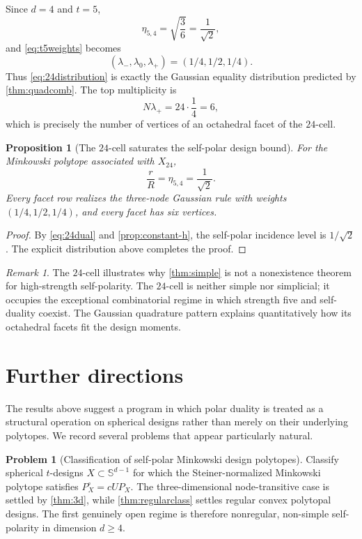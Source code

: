\documentclass[11pt]{amsart}
\newtheorem{proposition}[theorem]{Proposition}
\theoremstyle{definition}
\newtheorem{problem}[theorem]{Problem}
\theoremstyle{remark}
\newtheorem{remark}[theorem]{Remark}
\newcommand{\Sph}{\mathbb S}
\begin{document}
Since $d=4$ and $t=5$,
\[
 \eta_{5,4}=\sqrt{\frac3{6}}=\frac1{\sqrt2},
\]
and \eqref{eq:t5weights} becomes
\[
 (\lambda_-,\lambda_0,\lambda_+)=(1/4,1/2,1/4).
\]
Thus \eqref{eq:24distribution} is exactly the Gaussian equality distribution predicted by \cref{thm:quadcomb}.  The top multiplicity is
\[
 N\lambda_+=24\cdot\frac14=6,
\]
which is precisely the number of vertices of an octahedral facet of the $24$-cell.

\begin{proposition}[The $24$-cell saturates the self-polar design bound]\label{prop:24}
For the Minkowski polytope associated with $X_{24}$,
\[
 \frac rR=\eta_{5,4}=\frac1{\sqrt2}.
\]
Every facet row realizes the three-node Gaussian rule with weights $(1/4,1/2,1/4)$, and every facet has six vertices.
\end{proposition}

\begin{proof}
By \eqref{eq:24dual} and \cref{prop:constant-h}, the self-polar incidence level is $1/\sqrt2$.  The explicit distribution above completes the proof.  \qedhere
\end{proof}

\begin{remark}
The $24$-cell illustrates why \cref{thm:simple} is not a nonexistence theorem for high-strength self-polarity.  The $24$-cell is neither simple nor simplicial; it occupies the exceptional combinatorial regime in which strength five and self-duality coexist.  The Gaussian quadrature pattern explains quantitatively how its octahedral facets fit the design moments.
\end{remark}

\section{Further directions}
\label{sec:future}

The results above suggest a program in which polar duality is treated as a structural operation on spherical designs rather than merely on their underlying polytopes.  We record several problems that appear particularly natural.

\begin{problem}[Classification of self-polar Minkowski design polytopes]
Classify spherical $t$-designs $X\subset\Sph^{d-1}$ for which the Steiner-normalized Minkowski polytope satisfies $P_X^\circ=cUP_X$.  The three-dimensional node-transitive case is settled by \cref{thm:3d}, while \cref{thm:regularclass} settles regular convex polytopal designs.  The first genuinely open regime is therefore nonregular, non-simple self-polarity in dimension $d\ge4$.
\end{problem}
\end{document}

